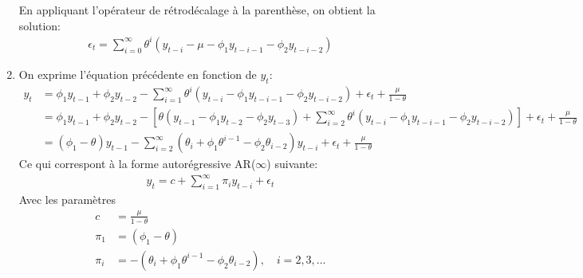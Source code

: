 \begin{exercice}
\begin{sol}
\begin{enumerate}
  En appliquant l'opérateur de rétrodécalage à la parenthèse, on obtient la solution:
  \begin{align*}
    \epsilon_t = \sum_{i=0}^{\infty} \theta^i \left(y_{t-i} - \mu - \phi_1 y_{t-i-1} - \phi_2 y_{t-i-2} \right)
  \end{align*}

\item
  
  On exprime l'équation précédente en fonction de $y_t$:
  \begin{align*}
    y_t &= \phi_1 y_{t-1} + \phi_2 y_{t-2} - \sum_{i=1}^{\infty} \theta^i \left(y_{t-i} - \phi_1 y_{t-i-1} - \phi_2 y_{t-i-2} \right) + \epsilon_t + \frac{\mu}{1-\theta} \\
    &= \phi_1 y_{t-1} + \phi_2 y_{t-2} - \left[\theta\left(y_{t-1}-\phi_1 y_{t-2} - \phi_2 y_{t-3} \right) + \sum_{i=2}^{\infty} \theta^i \left(y_{t-i} - \phi_1 y_{t-i-1} - \phi_2 y_{t-i-2} \right)\right] + \epsilon_t + \frac{\mu}{1-\theta}  \\
    &= (\phi_1 - \theta) y_{t-1} - \sum_{i=2}^{\infty} \left(\theta_i+\phi_1\theta^{i-1} - \phi_2\theta_{i-2}\right) y_{t-i} + \epsilon_t + \frac{\mu}{1-\theta}
  \end{align*}
  Ce qui correspont à la forme autorégressive AR($\infty$) suivante:
  \begin{align*}
    y_t = c + \sum_{i=1}^{\infty} \pi_i y_{t-i} + \epsilon_t
  \end{align*}
  Avec les paramètres
  \begin{align*}
    c &= \frac{\mu}{1-\theta} \\
    \pi_1 &= (\phi_1 - \theta) \\
    \pi_i &= -\left(\theta_i+\phi_1\theta^{i-1} - \phi_2\theta_{i-2}\right),\quad i=2,3,\ldots
  \end{align*}
\end{enumerate}
\end{sol}
\end{exercice}

